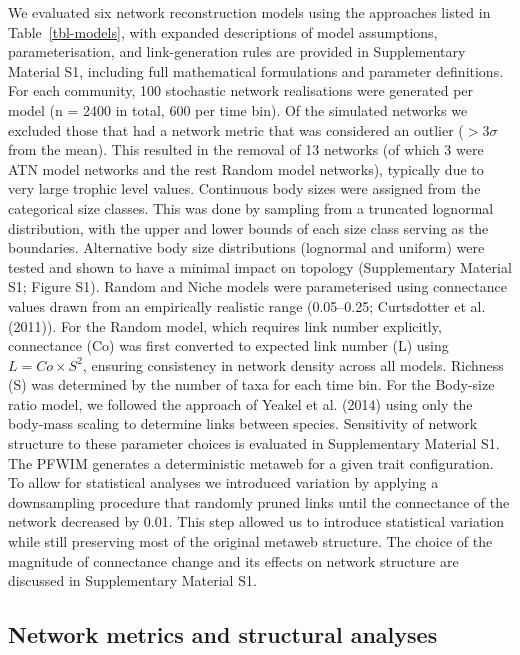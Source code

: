 \documentclass[
]{article}
\begin{document}
We evaluated six network reconstruction models using the approaches
listed in Table~\ref{tbl-models}, with expanded descriptions of model
assumptions, parameterisation, and link-generation rules are provided in
Supplementary Material S1, including full mathematical formulations and
parameter definitions. For each community, 100 stochastic network
realisations were generated per model (n = 2400 in total, 600 per time
bin). Of the simulated networks we excluded those that had a network
metric that was considered an outlier (\(> 3\sigma\) from the mean).
This resulted in the removal of 13 networks (of which 3 were ATN model
networks and the rest Random model networks), typically due to very
large trophic level values. Continuous body sizes were assigned from the
categorical size classes. This was done by sampling from a truncated
lognormal distribution, with the upper and lower bounds of each size
class serving as the boundaries. Alternative body size distributions
(lognormal and uniform) were tested and shown to have a minimal impact
on topology (Supplementary Material S1; Figure S1). Random and Niche
models were parameterised using connectance values drawn from an
empirically realistic range (0.05--0.25; Curtsdotter et al. (2011)). For
the Random model, which requires link number explicitly, connectance
(Co) was first converted to expected link number (L) using
\(L = Co\times S^2\), ensuring consistency in network density across all
models. Richness (S) was determined by the number of taxa for each time
bin. For the Body-size ratio model, we followed the approach of Yeakel
et al. (2014) using only the body-mass scaling to determine links
between species. Sensitivity of network structure to these parameter
choices is evaluated in Supplementary Material S1. The PFWIM generates a
deterministic metaweb for a given trait configuration. To allow for
statistical analyses we introduced variation by applying a downsampling
procedure that randomly pruned links until the connectance of the
network decreased by 0.01. This step allowed us to introduce statistical
variation while still preserving most of the original metaweb structure.
The choice of the magnitude of connectance change and its effects on
network structure are discussed in Supplementary Material S1.

\subsection{Network metrics and structural
analyses}\label{network-metrics-and-structural-analyses}
\end{document}
